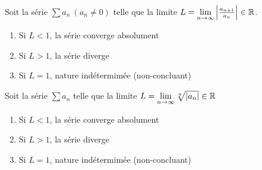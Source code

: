 		\begin{mythm}
			Soit la série $\sum a_n~(a_n\neq 0)$ telle que la limite $L=\lim\limits_{n\to\infty}\Big|\frac{a_{n+1}}{a_n}\Big|\in\mathbb{R}$.
			\begin{enumerate}[label=\alph*)]
				\item Si $L<1$, la série converge absolument
				\item Si $L>1$, la série diverge
				\item Si $L=1$, nature indétermimée (non-concluant) 
			\end{enumerate}
		\end{mythm}
		\begin{mythm}
			Soit la série $\sum a_n$ telle que la limite $L=\lim\limits_{n\to \infty}\sqrt[n]{|a_n|}\in\mathbb{R}$
			\begin{enumerate}[label=\alph*)]
				\item Si $L<1$, la série converge absolument
				\item Si $L>1$, la série diverge
				\item Si $L=1$, nature indétermimée (non-concluant) 
			\end{enumerate}
		\end{mythm}
